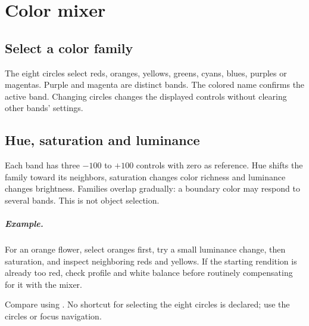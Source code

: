 \chapter{Color mixer}
\section{Select a color family}
The eight circles select reds, oranges, yellows, greens, cyans, blues, purples
or magentas. Purple and magenta are distinct bands. The colored name confirms
the active band. Changing circles changes the displayed controls without
clearing other bands' settings.

\section{Hue, saturation and luminance}
Each band has three $-100$ to  $+100$ controls with zero as reference. Hue shifts
the family toward its neighbors, saturation changes color richness and
luminance changes brightness. Families overlap gradually: a boundary color
may respond to several bands. This is not object selection.

\paragraph{Example.}
For an orange flower, select oranges first, try a small luminance change,
then saturation, and inspect neighboring reds and yellows. If the starting
rendition is already too red, check profile and white balance before routinely
compensating for it with the mixer.

Compare using . No shortcut for selecting the eight
circles is declared; use the circles or focus navigation.
\gestesreglages
